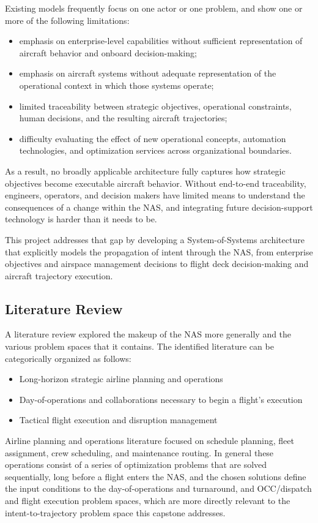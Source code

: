 Existing models frequently focus on one actor or one problem, and show one or more of the following limitations:
\begin{itemize}
    \item emphasis on enterprise-level capabilities without sufficient representation of aircraft behavior and onboard decision-making;
    \item emphasis on aircraft systems without adequate representation of the operational context in which those systems operate;
    \item limited traceability between strategic objectives, operational constraints, human decisions, and the resulting aircraft trajectories;
    \item difficulty evaluating the effect of new operational concepts, automation technologies, and optimization services across organizational boundaries.
\end{itemize}

As a result, no broadly applicable architecture fully captures how strategic objectives become executable aircraft behavior. Without end-to-end traceability, engineers, operators, and decision makers have limited means to understand the consequences of a change within the NAS, and integrating future decision-support technology is harder than it needs to be.

This project addresses that gap by developing a System-of-Systems architecture that explicitly models the propagation of intent through the NAS, from enterprise objectives and airspace management decisions to flight deck decision-making and aircraft trajectory execution.

\subsection{Literature Review}
\label{sec:litreview}
A literature review explored the makeup of the NAS more generally and the various problem spaces that it contains. The identified literature can be categorically organized as follows:
\begin{itemize}
    \item Long-horizon strategic airline planning and operations
    \item Day-of-operations and collaborations necessary to begin a flight's execution
    \item Tactical flight execution and disruption management
\end{itemize}

Airline planning and operations literature focused on schedule planning, fleet assignment, crew scheduling, and maintenance routing. In general these operations consist of a series of optimization problems that are solved sequentially, long before a flight enters the NAS, and the chosen solutions define the input conditions to the day-of-operations and turnaround, and OCC/dispatch and flight execution problem spaces, which are more directly relevant to the intent-to-trajectory problem space this capstone addresses.

